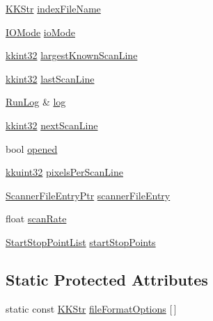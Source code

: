 \begin{DoxyCompactItemize}
\item 
\hyperlink{class_k_k_b_1_1_k_k_str}{K\+K\+Str} \hyperlink{class_k_k_l_s_c_1_1_scanner_file_a3ef604628bb0a487663326f93845c10e}{index\+File\+Name}
\item 
\hyperlink{class_k_k_l_s_c_1_1_scanner_file_a084784d6bd6c64ad11cbc6cd1bfaeb7e}{I\+O\+Mode} \hyperlink{class_k_k_l_s_c_1_1_scanner_file_a27ace8affebc2688586de9b72dd0de87}{io\+Mode}
\item 
\hyperlink{namespace_k_k_b_a8fa4952cc84fda1de4bec1fbdd8d5b1b}{kkint32} \hyperlink{class_k_k_l_s_c_1_1_scanner_file_a1f3173b38229a4f3035a2674c4263a2c}{largest\+Known\+Scan\+Line}
\item 
\hyperlink{namespace_k_k_b_a8fa4952cc84fda1de4bec1fbdd8d5b1b}{kkint32} \hyperlink{class_k_k_l_s_c_1_1_scanner_file_ae3275a2f28235ba289bf341cdc8373a6}{last\+Scan\+Line}
\item 
\hyperlink{class_k_k_b_1_1_run_log}{Run\+Log} \& \hyperlink{class_k_k_l_s_c_1_1_scanner_file_ac13ba14175151a7f0bb791c56e72af93}{log}
\item 
\hyperlink{namespace_k_k_b_a8fa4952cc84fda1de4bec1fbdd8d5b1b}{kkint32} \hyperlink{class_k_k_l_s_c_1_1_scanner_file_a8175e689d6539881903c75244ae1b73e}{next\+Scan\+Line}
\item 
bool \hyperlink{class_k_k_l_s_c_1_1_scanner_file_a74096c23c868e43e410ceddc327e704e}{opened}
\item 
\hyperlink{namespace_k_k_b_af8d832f05c54994a1cce25bd5743e19a}{kkuint32} \hyperlink{class_k_k_l_s_c_1_1_scanner_file_a07b4ac6b33c35ad0148c7a1422c73cfe}{pixels\+Per\+Scan\+Line}
\item 
\hyperlink{namespace_k_k_l_s_c_a54ff7eab3cb7195f02302b70282bfa8d}{Scanner\+File\+Entry\+Ptr} \hyperlink{class_k_k_l_s_c_1_1_scanner_file_a22190bfe80266f710f0a32a13e149381}{scanner\+File\+Entry}
\item 
float \hyperlink{class_k_k_l_s_c_1_1_scanner_file_aaf61fcf404e9dea9adc342bfd520a1f2}{scan\+Rate}
\item 
\hyperlink{class_k_k_l_s_c_1_1_start_stop_point_list}{Start\+Stop\+Point\+List} \hyperlink{class_k_k_l_s_c_1_1_scanner_file_ad60cc653f141392719dd5e2f018c5797}{start\+Stop\+Points}
\end{DoxyCompactItemize}
\subsection*{Static Protected Attributes}
\begin{DoxyCompactItemize}
\item 
static const \hyperlink{class_k_k_b_1_1_k_k_str}{K\+K\+Str} \hyperlink{class_k_k_l_s_c_1_1_scanner_file_a0dfb6d8d812cde3a9a23bad90f8b49f2}{file\+Format\+Options} \mbox{[}$\,$\mbox{]}
\end{DoxyCompactItemize}


